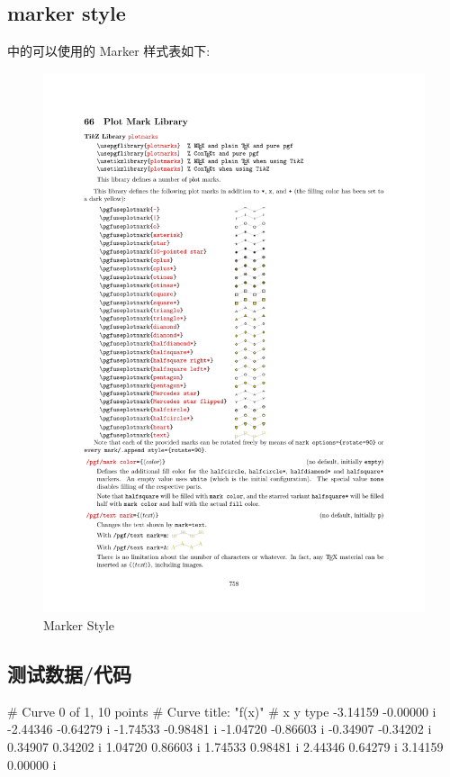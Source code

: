 \documentclass[
  hyper, lang=cn, 
  class=l3dox, 
]{../../zlatex/code/ztex}
\begin{document}
\subsection{marker style}
\TikZ{} 中的可以使用的 Marker 样式表如下:
\begin{figure}[!htb]
  \centering
  \includegraphics[width=\linewidth]{./support/pics/point_marker.pdf}
  \caption{\TikZ{} Marker Style}
  \label{fig:point-marker}
\end{figure}


\subsection{测试数据/代码}\label{imple:code-data}
\def\exampleUR{\textcolor{red}{\sffamily sine.data}}
\begin{DocExample}
# Curve 0 of 1, 10 points
# Curve title: "f(x)"
# x y type
-3.14159 -0.00000  i
-2.44346 -0.64279  i
-1.74533 -0.98481  i
-1.04720 -0.86603  i
-0.34907 -0.34202  i
0.34907 0.34202  i
1.04720 0.86603  i
1.74533 0.98481  i
2.44346 0.64279  i
3.14159 0.00000  i
\end{DocExample}
\end{document}
